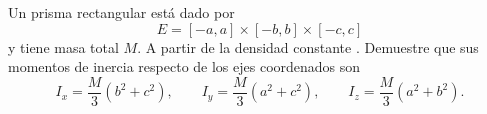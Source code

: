 Un prisma rectangular está dado por
\[
E=[-a,a]\times[-b,b]\times[-c,c]
\]
y tiene masa total $M$. A partir de la densidad constante . Demuestre que sus momentos de inercia respecto de los ejes coordenados son
\[
I_x=\frac{M}{3}(b^2+c^2),\qquad
I_y=\frac{M}{3}(a^2+c^2),\qquad
I_z=\frac{M}{3}(a^2+b^2).
\]
